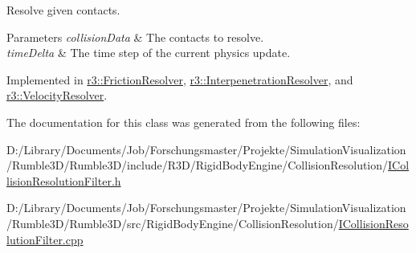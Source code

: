 Resolve given contacts. 


\begin{DoxyParams}{Parameters}
{\em collision\+Data} & The contacts to resolve. \\
\hline
{\em time\+Delta} & The time step of the current physics update. \\
\hline
\end{DoxyParams}


Implemented in \mbox{\hyperlink{classr3_1_1_friction_resolver_af26a84959e95749088f713176ec3c096}{r3\+::\+Friction\+Resolver}}, \mbox{\hyperlink{classr3_1_1_interpenetration_resolver_a7c896a7e8e0321c9f26b3d9c616d16ee}{r3\+::\+Interpenetration\+Resolver}}, and \mbox{\hyperlink{classr3_1_1_velocity_resolver_a93e8859d1ab3407b073328a58b7caeef}{r3\+::\+Velocity\+Resolver}}.



The documentation for this class was generated from the following files\+:\begin{DoxyCompactItemize}
\item 
D\+:/\+Library/\+Documents/\+Job/\+Forschungsmaster/\+Projekte/\+Simulation\+Visualization/\+Rumble3\+D/\+Rumble3\+D/include/\+R3\+D/\+Rigid\+Body\+Engine/\+Collision\+Resolution/\mbox{\hyperlink{_i_collision_resolution_filter_8h}{I\+Collision\+Resolution\+Filter.\+h}}\item 
D\+:/\+Library/\+Documents/\+Job/\+Forschungsmaster/\+Projekte/\+Simulation\+Visualization/\+Rumble3\+D/\+Rumble3\+D/src/\+Rigid\+Body\+Engine/\+Collision\+Resolution/\mbox{\hyperlink{_i_collision_resolution_filter_8cpp}{I\+Collision\+Resolution\+Filter.\+cpp}}\end{DoxyCompactItemize}

